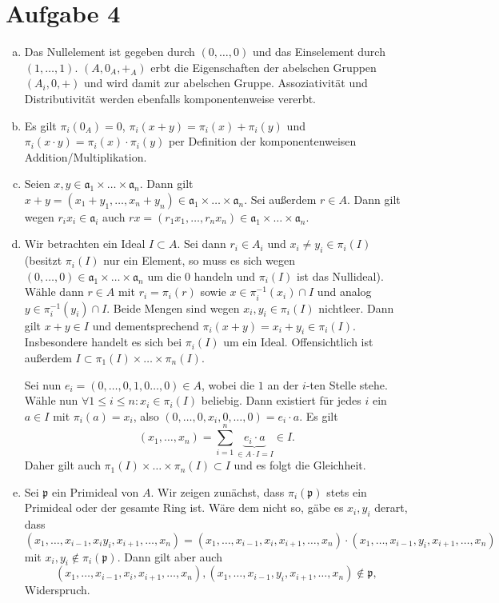 \documentclass{article}
\begin{document}
    \section*{Aufgabe 4}
    \begin{enumerate}[(a)]
        \item Das Nullelement ist gegeben durch $(0, \dots, 0)$ und das Einselement durch $(1, \dots, 1)$. $(A, 0_A,+_A)$ erbt die Eigenschaften der abelschen Gruppen $(A_i, 0, +)$ und wird damit zur abelschen Gruppe. Assoziativität und Distributivität werden ebenfalls komponentenweise vererbt.
        \item Es gilt $\pi_i(0_A) = 0$, $\pi_i(x + y) = \pi_i(x) + \pi_i(y)$ und $\pi_i(x \cdot y) = \pi_i(x) \cdot \pi_i(y)$ per Definition der komponentenweisen Addition/Multiplikation.
        \item Seien $x, y\in \mathfrak{a}_1 \times \dots \times \mathfrak{a}_n$. Dann gilt $x + y = (x_1 + y_1, \dots, x_n + y_n) \in \mathfrak{a}_1 \times \dots \times \mathfrak{a}_n$. Sei außerdem $r \in A$. Dann gilt wegen $r_ix_i \in \mathfrak{a}_i$ auch $rx = (r_1x_1, \dots, r_nx_n) \in \mathfrak{a}_1 \times \dots \times \mathfrak{a}_n$.
        \item Wir betrachten ein Ideal $I \subset A$. Sei dann $r_i \in A_i$ und $x_i \neq y_i \in \pi_i(I)$ (besitzt $\pi_i(I)$ nur ein Element, so muss es sich wegen $(0,\dots, 0) \in \mathfrak{a}_1 \times \dots \times \mathfrak{a}_n$ um die 0 handeln und $\pi_i(I)$ ist das Nullideal).
        Wähle dann $r \in A$ mit $r_i = \pi_i(r)$ sowie $x \in \pi_i^{-1}(x_i) \cap I$ und analog $y \in \pi_i^{-1}(y_i)\cap I$. Beide Mengen sind wegen $x_i, y_i \in \pi_i(I)$ nichtleer. Dann gilt $x + y \in I$ und dementsprechend $\pi_i(x + y) = x_i + y_i \in \pi_i(I)$. Insbesondere handelt es sich bei $\pi_i(I)$ um ein Ideal.
        Offensichtlich ist außerdem $I \subset \pi_1(I) \times \dots \times \pi_n(I)$.

        Sei nun $e_i = (0, \dots, 0,1,0 \dots, 0) \in A$, wobei die $1$ an der $i$-ten Stelle stehe.
        Wähle nun $\forall 1\leq i \leq n: x_i \in \pi_i(I)$ beliebig.
        Dann existiert für jedes $i$ ein $a\in I$ mit $\pi_i(a) = x_i$, also $(0, \dots, 0, x_i, 0, \dots, 0) = e_i \cdot a$. Es gilt
        \[
            (x_1, \dots, x_n) = \sum_{i = 1}^{n} \underbrace{e_i \cdot a}_{\in A\cdot I = I} \in I.
        \]
        Daher gilt auch $\pi_1(I) \times \dots \times \pi_n(I) \subset I$ und es folgt die Gleichheit.
        \item Sei $\mathfrak{p}$ ein Primideal von $A$. Wir zeigen zunächst, dass $\pi_i(\mathfrak{p})$ stets ein Primideal oder der gesamte Ring ist.
        Wäre dem nicht so, gäbe es $x_i, y_i$ derart, dass 
        \[ 
            (x_1, \dots, x_{i-1}, x_iy_i, x_{i+1}, \dots, x_n) = (x_1, \dots, x_{i-1}, x_i, x_{i+1}, \dots, x_n) \cdot (x_1, \dots, x_{i-1}, y_i, x_{i+1}, \dots, x_n)
        \]
        mit $x_i, y_i \notin \pi_i(\mathfrak{p})$. Dann gilt aber auch
        \[
            (x_1, \dots, x_{i-1}, x_i, x_{i+1}, \dots, x_n), (x_1, \dots, x_{i-1}, y_i, x_{i+1}, \dots, x_n) \notin \mathfrak{p},
        \]
        Widerspruch.
        

\end{enumerate}
\end{document}

